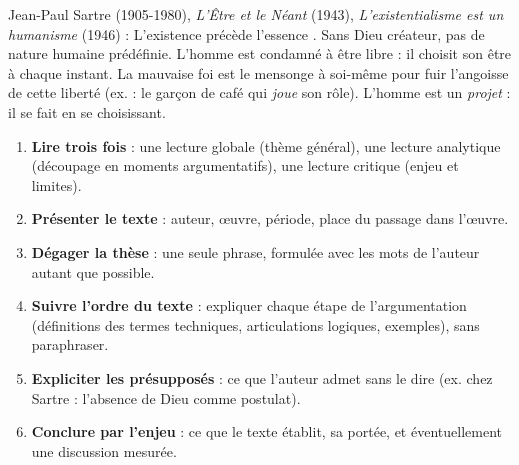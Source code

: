 \documentclass[11pt]{article}
\newcommand{\cle}[1]{{\popxbold\color{popdark}#1}}
\begin{document}
\begin{propriete}
Jean-Paul Sartre (1905-1980), \emph{L'Être et le Néant} (1943), \emph{L'existentialisme est un humanisme} (1946) : \guillemotleft L'existence précède l'essence \guillemotright. Sans Dieu créateur, pas de nature humaine prédéfinie. L'homme est \cle{condamné à être libre} : il choisit son être à chaque instant. La \cle{mauvaise foi} est le mensonge à soi-même pour fuir l'angoisse de cette liberté (ex. : le garçon de café qui \emph{joue} son rôle). L'homme est un \emph{projet} : il se fait en se choisissant.
\end{propriete}

\begin{methode}
\begin{enumerate}
\item \textbf{Lire trois fois} : une lecture globale (thème général), une lecture analytique (découpage en moments argumentatifs), une lecture critique (enjeu et limites).
\item \textbf{Présenter le texte} : auteur, œuvre, période, place du passage dans l'œuvre.
\item \textbf{Dégager la thèse} : une seule phrase, formulée avec les mots de l'auteur autant que possible.
\item \textbf{Suivre l'ordre du texte} : expliquer chaque étape de l'argumentation (définitions des termes techniques, articulations logiques, exemples), sans paraphraser.
\item \textbf{Expliciter les présupposés} : ce que l'auteur admet sans le dire (ex. chez Sartre : l'absence de Dieu comme postulat).
\item \textbf{Conclure par l'enjeu} : ce que le texte établit, sa portée, et éventuellement une discussion mesurée.
\end{enumerate}
\end{methode}
\end{document}
